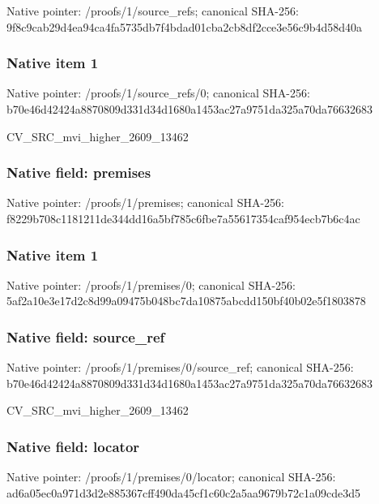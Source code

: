 \documentclass[10pt,a4paper]{article}
\begin{document}
Native pointer: /proofs/1/source\_refs; canonical SHA-256: 9f8c9cab29d4ea94ca4fa573\allowbreak{}5db7f4bdad01cba2cb8df2cc\allowbreak{}e3e56c9b4d58d40a



\subsubsection{Native item 1}


Native pointer: /proofs/1/source\_refs/0; canonical SHA-256: b70e46d42424a8870809d331\allowbreak{}d34d1680a1453ac27a9751da\allowbreak{}325a70da76632683


CV\_SRC\_mvi\_higher\_2609\_13462


\subsubsection{Native field: premises}


Native pointer: /proofs/1/premises; canonical SHA-256: f8229b708c1181211de344dd\allowbreak{}16a5bf785c6fbe7a55617354\allowbreak{}caf954ecb7b6c4ac



\subsubsection{Native item 1}


Native pointer: /proofs/1/premises/0; canonical SHA-256: 5af2a10e3e17d2c8d99a0947\allowbreak{}5b048bc7da10875abcdd150b\allowbreak{}f40b02e5f1803878



\subsubsection{Native field: source\_ref}


Native pointer: /proofs/1/premises/0/source\_ref; canonical SHA-256: b70e46d42424a8870809d331\allowbreak{}d34d1680a1453ac27a9751da\allowbreak{}325a70da76632683


CV\_SRC\_mvi\_higher\_2609\_13462


\subsubsection{Native field: locator}


Native pointer: /proofs/1/premises/0/locator; canonical SHA-256: ad6a05ec0a971d3d2e885367\allowbreak{}cff490da45cf1c60c2a5aa96\allowbreak{}79b72c1a09cde3d5
\end{document}
